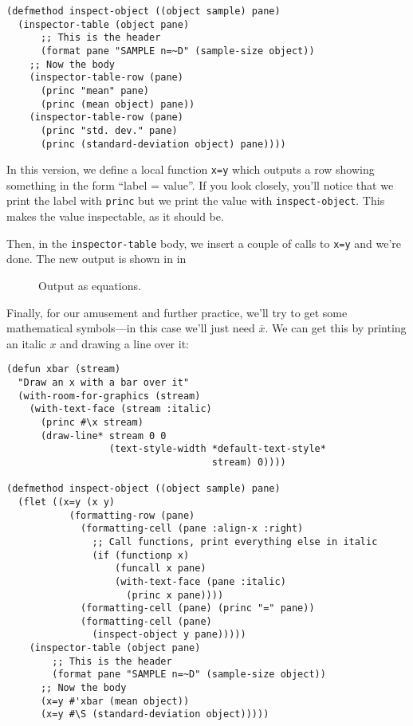 \begin{verbatim}
(defmethod inspect-object ((object sample) pane)
  (inspector-table (object pane)
      ;; This is the header
      (format pane "SAMPLE n=~D" (sample-size object))
    ;; Now the body
    (inspector-table-row (pane)
      (princ "mean" pane)
      (princ (mean object) pane))
    (inspector-table-row (pane)
      (princ "std. dev." pane)
      (princ (standard-deviation object) pane))))
\end{verbatim}

In this version, we define a local function \texttt{x=y} which outputs a row
showing something in the form ``label = value''. If you look closely,
you'll notice that we print the label with \texttt{princ} but we print the
value with \texttt{inspect-object}. This makes the value inspectable, as
it should be.

Then, in the \texttt{inspector-table} body, we insert a couple of
calls to \texttt{x=y} and we're done.  The new output is shown in in

\begin{figure}
\begin{center}
\end{center}
\caption{\label{fig-inspect-object-2}
Output as equations.}
\end{figure}

Finally, for our amusement and further practice, we'll try to get some
mathematical symbols---in this case we'll just need $\overline
{x}$. We can get this by printing an italic $x$ and drawing a line
over it:

\begin{verbatim}
(defun xbar (stream)
  "Draw an x with a bar over it"
  (with-room-for-graphics (stream)
    (with-text-face (stream :italic)
      (princ #\x stream)
      (draw-line* stream 0 0
                  (text-style-width *default-text-style*
                                    stream) 0))))

(defmethod inspect-object ((object sample) pane)
  (flet ((x=y (x y)
           (formatting-row (pane)
             (formatting-cell (pane :align-x :right)
               ;; Call functions, print everything else in italic
               (if (functionp x)
                   (funcall x pane)
                   (with-text-face (pane :italic)
                     (princ x pane))))
             (formatting-cell (pane) (princ "=" pane))
             (formatting-cell (pane)
               (inspect-object y pane)))))
    (inspector-table (object pane)
        ;; This is the header
        (format pane "SAMPLE n=~D" (sample-size object))
      ;; Now the body
      (x=y #'xbar (mean object))
      (x=y #\S (standard-deviation object)))))
\end{verbatim}

